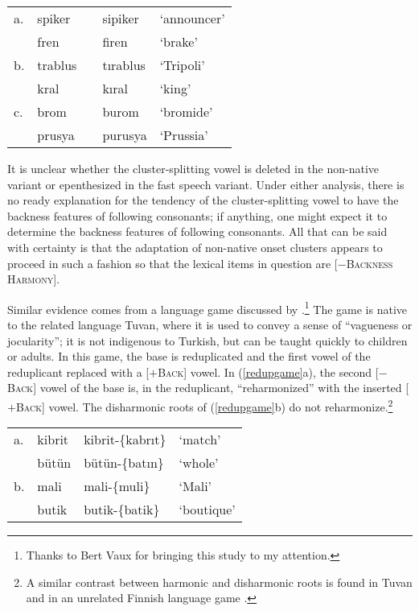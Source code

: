 \begin{example} 
\begin{tabular}{lllll}
a. & {spiker}  & \alt{} & {sipiker}  & `announcer' \\
   & {fren}    & \alt{} & {firen}    & `brake'     \\
b. & {trablus} & \alt{} & {tırablus} & `Tripoli'   \\
   & {kral}    & \alt{} & {kıral}    & `king'      \\
c. & {brom}    & \alt{} & {burom}    & `bromide'   \\
   & {prusya}  & \alt{} & {purusya}  & `Prussia'   \\
\end{tabular}
\label{spiker}
\end{example}

\noindent
It is unclear whether the cluster-splitting vowel is deleted in the non-native variant or epenthesized in the fast speech variant. Under either analysis, there is no ready explanation for the tendency of the cluster-splitting vowel to have the backness features of following consonants; if anything, one might expect it to determine the backness features of following consonants. All that can be said with certainty is that the adaptation of non-native onset clusters appears to proceed in such a fashion so that the lexical items in question are [$-$\textsc{Backness Harmony}].

Similar evidence comes from a language game discussed by \citet{Harrison2001}.\footnote{Thanks to Bert Vaux for bringing this study to my attention.} 
The game is native to the related language Tuvan, where it is used to convey a sense of ``vagueness or jocularity''; it is not indigenous to Turkish, but can be taught quickly to children or adults. In this game, the base is reduplicated and the first vowel of the reduplicant replaced with a [$+$\textsc{Back}] vowel. In (\ref{redupgame}a), the second [$-$\textsc{Back}] vowel of the base is, in the reduplicant, ``reharmonized'' with the inserted [$+$\textsc{Back}] vowel. The disharmonic roots of (\ref{redupgame}b) do not reharmonize.\footnote{A similar contrast between harmonic and disharmonic roots is found in Tuvan \citep{Harrison2001} and in an unrelated Finnish language game \citep{Campbell1986}.}

\begin{example} 
\label{redupgame}
\begin{tabular}{llll}
a. & {kibrit} & {kibrit}-\{{kabrıt}\} & `match'    \\
   & {bütün}  & {bütün}-\{{batın}\}   & `whole'    \\
b. & {mali}   & {mali}-\{{muli}\}     & `Mali'     \\
   & {butik}  & {butik}-\{{batik}\}   & `boutique' \\
\end{tabular}
\end{example}

